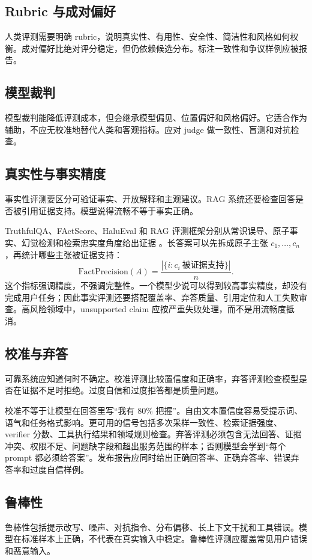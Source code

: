 \documentclass[UTF8,zihao=-4,openany]{ctexbook}
\begin{document}
\subsection{Rubric 与成对偏好}
人类评测需要明确 rubric，说明真实性、有用性、安全性、简洁性和风格如何权衡。成对偏好比绝对评分稳定，但仍依赖候选分布。标注一致性和争议样例应被报告。

\subsection{模型裁判}
模型裁判能降低评测成本，但会继承模型偏见、位置偏好和风格偏好。它适合作为辅助，不应无校准地替代人类和客观指标。应对 judge 做一致性、盲测和对抗检查。

\subsection{真实性与事实精度}
事实性评测要区分可验证事实、开放解释和主观建议。RAG 系统还要检查回答是否被引用证据支持。模型说得流畅不等于事实正确。

TruthfulQA、FActScore、HaluEval 和 RAG 评测框架分别从常识误导、原子事实、幻觉检测和检索忠实度角度给出证据 \cite{lin2021truthfulqa,min2023factscore,li2023halueval,es2023ragas,gan2025rag}。长答案可以先拆成原子主张 $c_1,\ldots,c_n$，再统计哪些主张被证据支持：
\[
  \mathrm{FactPrecision}(A)=\frac{|\{i:c_i\ \text{被证据支持}\}|}{n}.
\]
这个指标强调精度，不强调完整性。一个模型少说可以得到较高事实精度，却没有完成用户任务；因此事实评测还要搭配覆盖率、弃答质量、引用定位和人工失败审查。高风险领域中，unsupported claim 应按严重失败处理，而不是用流畅度抵消。

\subsection{校准与弃答}
可靠系统应知道何时不确定。校准评测比较置信度和正确率，弃答评测检查模型是否在证据不足时拒绝。过度自信和过度拒答都是质量问题。

校准不等于让模型在回答里写“我有 80\% 把握”。自由文本置信度容易受提示词、语气和任务格式影响。更可用的信号包括多次采样一致性、检索证据强度、verifier 分数、工具执行结果和领域规则检查。弃答评测必须包含无法回答、证据冲突、权限不足、问题缺字段和超出服务范围的样本；否则模型会学到“每个 prompt 都必须给答案”。发布报告应同时给出正确回答率、正确弃答率、错误弃答率和过度自信样例。

\subsection{鲁棒性}
鲁棒性包括提示改写、噪声、对抗指令、分布偏移、长上下文干扰和工具错误。模型在标准样本上正确，不代表在真实输入中稳定。鲁棒性评测应覆盖常见用户错误和恶意输入。
\end{document}

